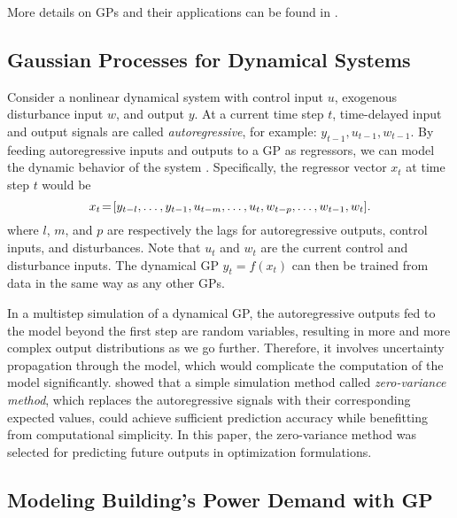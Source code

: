 More details on GPs and their applications can be found in \cite{Rasmussen2006}.

\subsection{Gaussian Processes for Dynamical Systems}
\label{SS:intro-gp:control}

Consider a nonlinear dynamical system with control input \(u\), exogenous disturbance input \(w\), and output \(y\).
At a current time step $t$, time-delayed input and output signals are called \emph{autoregressive}, for example: $y_{t-1}, u_{t-1}, w_{t-1}$.
By feeding autoregressive inputs and outputs to a GP as regressors, we can model the dynamic behavior of the system \cite{Kocijan2016}.
Specifically, the regressor vector $x_{t}$ at time step $t$ would be
\begin{equation*}
x_{t}\!=\![y_{t-l}, \dots, y_{t-1}, u_{t-m}, \dots, u_t, w_{t-p}, \dots, w_{t-1}, w_t] \text.
\end{equation*}
where \(l\), \(m\), and \(p\) are respectively the lags for autoregressive outputs, control inputs, and disturbances.
Note that \(u_t\) and \(w_t\) are the current control and disturbance inputs.
The dynamical GP
\begin{math}
y_{t} = f(x_t)
\end{math}
can then be trained from data in the same way as any other GPs.

In a multistep simulation of a dynamical GP, the autoregressive outputs fed to the model beyond the first step are random variables, resulting in more and more complex output distributions as we go further.
Therefore, it involves uncertainty propagation through the model, which would complicate the computation of the model significantly.
\cite{nghiemetal16gp} showed that a simple simulation method called \emph{zero-variance method}, which replaces the autoregressive signals with their corresponding expected values, could achieve sufficient prediction accuracy while benefitting from computational simplicity.
In this paper, the zero-variance method was selected for predicting future outputs in optimization formulations.


\subsection{Modeling Building's Power Demand with GP}
\label{sec:gp:bldg-modeling}

